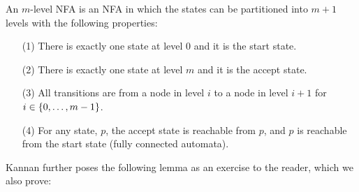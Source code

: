 \begin{definition}
  An \(m\)-level NFA is an NFA in which the states can be
  partitioned into \(m + 1\) levels with the following properties:
  \begin{enumerate}
    \item[(1)]
      There is exactly one state at level \(0\) and it is the start state.

    \item[(2)]
      There is exactly one state at level \(m\) and it is the accept state.

    \item[(3)]
      All transitions are from a node in level \(i\) to a node in
      level \(i + 1\) for \(i \in \left\{0, \ldots, m - 1\right\}\).

    \item[(4)]
      For any state, \(p\),
      the accept state is reachable from \(p\),
      and \(p\) is reachable from the start state
      (fully connected automata).
  \end{enumerate}
\end{definition}

Kannan further poses the following lemma as an exercise to the reader,
which we also prove:

